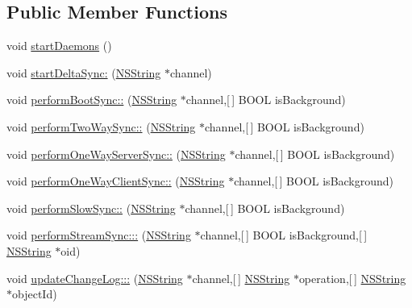 \subsection*{\-Public \-Member \-Functions}
\begin{DoxyCompactItemize}
\item 
void \hyperlink{interface_sync_service_a62662a7e0d0489b0e3da8ded6e9ed1dc}{start\-Daemons} ()
\item 
void \hyperlink{interface_sync_service_a8c3a6c6399abb48758f373db82920184}{start\-Delta\-Sync\-:} (\hyperlink{class_n_s_string}{\-N\-S\-String} $\ast$channel)
\item 
void \hyperlink{interface_sync_service_aed9eb7063f95dad45602035e12c4c507}{perform\-Boot\-Sync\-::} (\hyperlink{class_n_s_string}{\-N\-S\-String} $\ast$channel,\mbox{[}$\,$\mbox{]} \-B\-O\-O\-L is\-Background)
\item 
void \hyperlink{interface_sync_service_aa36781d8c95512e8d3739276ad519795}{perform\-Two\-Way\-Sync\-::} (\hyperlink{class_n_s_string}{\-N\-S\-String} $\ast$channel,\mbox{[}$\,$\mbox{]} \-B\-O\-O\-L is\-Background)
\item 
void \hyperlink{interface_sync_service_acc6039404459752f3b81b1e07adb72c8}{perform\-One\-Way\-Server\-Sync\-::} (\hyperlink{class_n_s_string}{\-N\-S\-String} $\ast$channel,\mbox{[}$\,$\mbox{]} \-B\-O\-O\-L is\-Background)
\item 
void \hyperlink{interface_sync_service_a746882bfd7e306c87a4f9dc90cf1f43a}{perform\-One\-Way\-Client\-Sync\-::} (\hyperlink{class_n_s_string}{\-N\-S\-String} $\ast$channel,\mbox{[}$\,$\mbox{]} \-B\-O\-O\-L is\-Background)
\item 
void \hyperlink{interface_sync_service_addd2e2179ad10b5286a53e7bc0b413c8}{perform\-Slow\-Sync\-::} (\hyperlink{class_n_s_string}{\-N\-S\-String} $\ast$channel,\mbox{[}$\,$\mbox{]} \-B\-O\-O\-L is\-Background)
\item 
void \hyperlink{interface_sync_service_ae3812ed2d5ecf3da914949ca38465380}{perform\-Stream\-Sync\-:::} (\hyperlink{class_n_s_string}{\-N\-S\-String} $\ast$channel,\mbox{[}$\,$\mbox{]} \-B\-O\-O\-L is\-Background,\mbox{[}$\,$\mbox{]} \hyperlink{class_n_s_string}{\-N\-S\-String} $\ast$oid)
\item 
void \hyperlink{interface_sync_service_add4957596a4168c39fcc68b3fe4eb71e}{update\-Change\-Log\-:::} (\hyperlink{class_n_s_string}{\-N\-S\-String} $\ast$channel,\mbox{[}$\,$\mbox{]} \hyperlink{class_n_s_string}{\-N\-S\-String} $\ast$operation,\mbox{[}$\,$\mbox{]} \hyperlink{class_n_s_string}{\-N\-S\-String} $\ast$object\-Id)

\end{DoxyCompactItemize}
